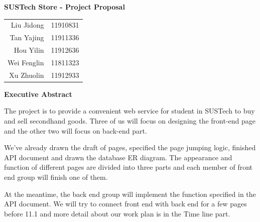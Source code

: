 \documentclass[12pt]{article}  %
\begin{document}
\begin{center}
\begin{LARGE}
\textbf{SUSTech Store - Project Proposal}
\end{LARGE}

\vspace{20pt}
\begin{large}
\begin{center}
	\begin{tabular}{rl}
	
	
	Liu Jidong & 11910831 \\
	Tan Yajing & 11911336 \\
	Hou Yilin & 11912636 \\
	Wei Fenglin & 11811323 \\
	Xu Zhuolin & 11912933
	\end{tabular}
  \end{center}


\end{large}

\vspace{20pt}

\begin{Large}
\textbf{Executive Abstract}
\end{Large}
\end{center}

\begin{large}
	The project is to provide a convenient web service 
for student in SUSTech to buy and sell secondhand goods. 
Three of us will focus on designing the front-end page 
and the other two will focus on back-end part. 

We've already drawn the draft of pages, specified the page 
jumping logic, finished API document and drawn the 
database ER diagram. The appearance and function of 
different pages are divided into three parts and each 
member of front end group will finish one of them. 

At the meantime, the back end group will implement 
the function specified in the API document. We will 
try to connect front end with back end for a few pages 
before 11.1 and more detail about our work plan is in 
the Time line part.
\end{large}
\end{document}

